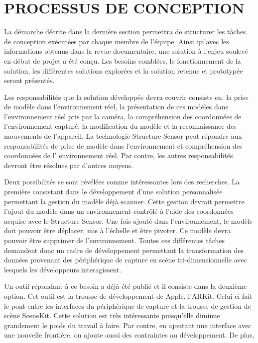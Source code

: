 \documentclass[letterpaper,twoside,12pt,french]{report}
\begin{document}
\chapter*{\uppercase{Processus de conception}}
La démarche décrite dans la dernière section permettra de structurer les tâches de conception
exécutées par chaque membre de l'équipe. Ainsi qu'avec les informations obtenus dans la revue
documentaire, une solution à l'enjeu soulevé en début de projet a été conçu. Les besoins comblées,
le fonctionnement de la solution, les différentes solutions explorées et la solution retenue et
prototypée seront présentés.
\par
Les responsabilités que la solution développée devra couvrir consiste en: la prise de modèle dans
l'environnement réel, la présentation de ces modèles dans l'environnement réel pris par la caméra,
la compréhension des coordonnées de l'environnement capturé, la modification du modèle et la
reconnaissance des mouvements de l'appareil. La technologie Structure Sensor peut répondre aux
responsabilités de prise de modèle dans l'environnement et compréhension des coordonnées de l'
environnement réel. Par contre, les autres responsabilités devront être résolues par d'autres
moyens.
\par
Deux possibilités se sont révélées comme intéressantes lors des recherches. La première consistant
dans le développement d'une solution personnalisée permettant la gestion du modèle déjà scanner.
Cette gestion devrait permettre l'ajout du modèle dans un environnement contrôlé à l'aide des
coordonnées acquise avec le Structure Sensor. Une fois ajouté dans l'environnement, le modèle doit 
pouvoir être déplacer, mis à l'échelle et être pivoter. Ce modèle devra pouvoir être supprimer de
l'environnement. Toutes ces différentes tâches demandent donc un cadre de développement permettant
la transformation des données provenant des périphérique de capture en scène tri-dimensionnelle
avec lesquels les développeurs interagissent.
\par
Un outil répondant à ce besoin a déjà été publié et il consiste dans la deuxième option. Cet outil
est la trousse de développement de Apple, l'ARKit. Celui-ci fait le pont entre les interfaces du
périphérique de capture et la trousse de gestion de scène SceneKit. Cette solution est très
intéressante puisqu'elle diminue grandement le poids du travail à faire. Par contre, en ajoutant une
interface avec une nouvelle frontière, on ajoute aussi des contraintes au développement. De plus,
\end{document}

